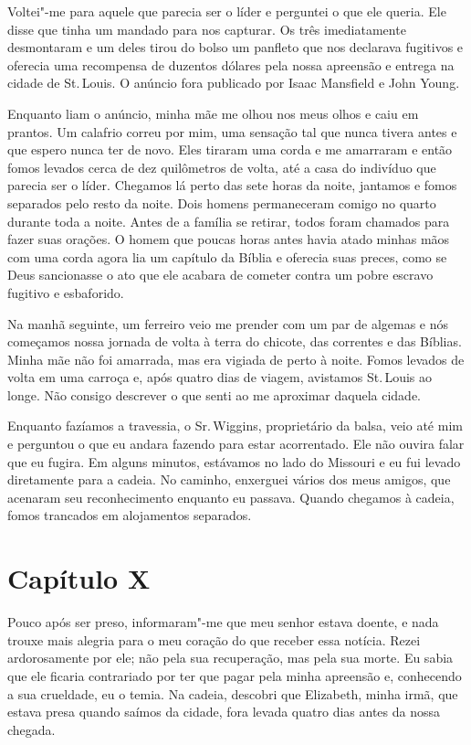 Voltei"-me para aquele que parecia ser o líder e perguntei o que ele
queria. Ele disse que tinha um mandado para nos capturar. Os três
imediatamente desmontaram e um deles tirou do bolso um panfleto que nos
declarava fugitivos e oferecia uma recompensa de duzentos dólares pela
nossa apreensão e entrega na cidade de St.\,Louis. O anúncio fora
publicado por Isaac Mansfield e John Young.

Enquanto liam o anúncio, minha mãe me olhou nos meus olhos e caiu em
prantos. Um calafrio correu por mim, uma sensação tal que nunca tivera
antes e que espero nunca ter de novo. Eles tiraram uma corda e me
amarraram e então fomos levados cerca de dez quilômetros de volta, até a
casa do indivíduo que parecia ser o líder. Chegamos lá perto das sete
horas da noite, jantamos e fomos separados pelo resto da noite. Dois
homens permaneceram comigo no quarto durante toda a noite. Antes de a
família se retirar, todos foram chamados para fazer suas orações. O
homem que poucas horas antes havia atado minhas mãos com uma corda agora
lia um capítulo da Bíblia e oferecia suas preces, como se Deus
sancionasse o ato que ele acabara de cometer contra um pobre escravo
fugitivo e esbaforido.

Na manhã seguinte, um ferreiro veio me prender com um par de algemas e
nós começamos nossa jornada de volta à terra do chicote, das correntes e
das Bíblias. Minha mãe não foi amarrada, mas era vigiada de perto à
noite. Fomos levados de volta em uma carroça e, após quatro dias de
viagem, avistamos St.\,Louis ao longe. Não consigo descrever o que senti
ao me aproximar daquela cidade.

Enquanto fazíamos a travessia, o Sr.\,Wiggins, proprietário da balsa,
veio até mim e perguntou o que eu andara fazendo para estar acorrentado.
Ele não ouvira falar que eu fugira. Em alguns minutos, estávamos no lado
do Missouri e eu fui levado diretamente para a cadeia. No caminho,
enxerguei vários dos meus amigos, que acenaram seu reconhecimento
enquanto eu passava. Quando chegamos à cadeia, fomos trancados em
alojamentos separados.

\chapter*{Capítulo X}

Pouco após ser preso, informaram"-me que meu senhor estava doente, e nada
trouxe mais alegria para o meu coração do que receber essa notícia.
Rezei ardorosamente por ele; não pela sua recuperação, mas pela sua
morte. Eu sabia que ele ficaria contrariado por ter que pagar pela minha
apreensão e, conhecendo a sua crueldade, eu o temia. Na cadeia, descobri
que Elizabeth, minha irmã, que estava presa quando saímos da cidade,
fora levada quatro dias antes da nossa chegada.

